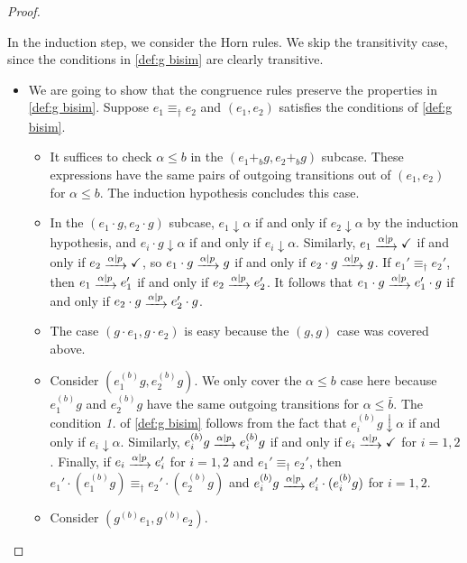 \documentclass[orivec,envcountsect,envcountsame]{llncs}
\begin{document}
\begin{proof}
\begin{itemize}
\begin{itemize}
		\end{itemize}
	\end{itemize}
	In the induction step, we consider the Horn rules.
	We skip the transitivity case, since the conditions in \cref{def:g bisim} are clearly transitive.
	\begin{itemize}
		\item We are going to show that the congruence rules preserve the properties in \cref{def:g bisim}.
		Suppose \(e_1 \equiv_\dagger e_2\) and \((e_1, e_2)\) satisfies the conditions of \cref{def:g bisim}.
		\begin{itemize}
			\item It suffices to check \(\alpha \le b\) in the \((e_1 +_b g, e_2 +_b g)\) subcase. These expressions have the same pairs of outgoing transitions out of \((e_1, e_2)\) for \(\alpha \le b\). The induction hypothesis concludes this case.
			\item In the \((e_1\cdot g, e_2\cdot g)\) subcase, \(e_1 \downarrow \alpha\) if and only if \(e_2 \downarrow \alpha\) by the induction hypothesis, and \(e_i \cdot g \downarrow \alpha\) if and only if \(e_i \downarrow \alpha\). Similarly, \(e_1 \tr{\alpha \mid p} \checkmark\) if and only if \(e_2 \tr{\alpha \mid p} \checkmark\), so \(e_1\cdot g \tr{\alpha \mid p} g\) if and only if \(e_2 \cdot g \tr{\alpha \mid p} g\). If \(e_1' \equiv_\dagger e_2'\), then \(e_1 \tr{\alpha \mid p} e_1'\) if and only if \(e_2 \tr{\alpha \mid p} e_2'\). It follows that \(e_1\cdot g \tr{\alpha \mid p} e_1'\cdot g\) if and only if \(e_2\cdot g \tr{\alpha \mid p} e_2'\cdot g\).
			\item The case \((g\cdot e_1, g \cdot e_2)\) is easy because the \((g, g)\) case was covered above.
			\item Consider \((e_1^{(b)}g, e_2^{(b)}g)\).
			We only cover the \(\alpha \le b\) case here because \(e_1^{(b)}g\) and \(e_2^{(b)}g\) have the same outgoing transitions for \(\alpha \le \bar b\). The condition \emph{1.} of \cref{def:g bisim} follows from the fact that \(e_i ^{(b)} g \downarrow \alpha\) if and only if \(e_i \downarrow \alpha\). Similarly, \(e_i ^{(b)} g \tr{\alpha \mid p} e_i ^{(b)} g\) if and only if \(e_i \tr{\alpha \mid p} \checkmark\) for \(i=1,2\). Finally, if \(e_i \tr{\alpha \mid p} e_i'\) for \(i=1,2\) and \(e_1' \equiv_\dagger e_2'\), then \(e_1'\cdot (e_1 ^{(b)} g) \equiv_\dagger e_2'\cdot (e_2 ^{(b)} g)\) and \(e_i ^{(b)} g \tr{\alpha\mid p} e_i' \cdot (e_i ^{(b)} g)\) for \(i = 1,2\).
            \item Consider $(g^{(b)}e_1, g^{(b)}e_2)$.

\end{itemize}
\end{itemize}
\end{proof}
\end{document}

